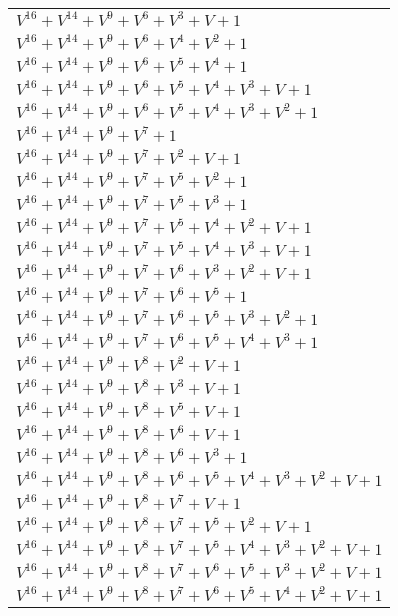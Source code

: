 \documentclass[12pt]{article}
\begin{document}
\begin{adjustwidth}{-4cm}{}
\begin{center}
\begin{longtable}{|l|}
$V^{16}  +V^{14}  +V^{9}  +V^{6}  +V^{3}  + V + 1$ \\
$V^{16}  +V^{14}  +V^{9}  +V^{6}  +V^{4}  +V^{2}  + 1$ \\
$V^{16}  +V^{14}  +V^{9}  +V^{6}  +V^{5}  +V^{4}  + 1$ \\
$V^{16}  +V^{14}  +V^{9}  +V^{6}  +V^{5}  +V^{4}  +V^{3}  + V + 1$ \\
$V^{16}  +V^{14}  +V^{9}  +V^{6}  +V^{5}  +V^{4}  +V^{3}  +V^{2}  + 1$ \\
$V^{16}  +V^{14}  +V^{9}  +V^{7}  + 1$ \\
$V^{16}  +V^{14}  +V^{9}  +V^{7}  +V^{2}  + V + 1$ \\
$V^{16}  +V^{14}  +V^{9}  +V^{7}  +V^{5}  +V^{2}  + 1$ \\
$V^{16}  +V^{14}  +V^{9}  +V^{7}  +V^{5}  +V^{3}  + 1$ \\
$V^{16}  +V^{14}  +V^{9}  +V^{7}  +V^{5}  +V^{4}  +V^{2}  + V + 1$ \\
$V^{16}  +V^{14}  +V^{9}  +V^{7}  +V^{5}  +V^{4}  +V^{3}  + V + 1$ \\
$V^{16}  +V^{14}  +V^{9}  +V^{7}  +V^{6}  +V^{3}  +V^{2}  + V + 1$ \\
$V^{16}  +V^{14}  +V^{9}  +V^{7}  +V^{6}  +V^{5}  + 1$ \\
$V^{16}  +V^{14}  +V^{9}  +V^{7}  +V^{6}  +V^{5}  +V^{3}  +V^{2}  + 1$ \\
$V^{16}  +V^{14}  +V^{9}  +V^{7}  +V^{6}  +V^{5}  +V^{4}  +V^{3}  + 1$ \\
$V^{16}  +V^{14}  +V^{9}  +V^{8}  +V^{2}  + V + 1$ \\
$V^{16}  +V^{14}  +V^{9}  +V^{8}  +V^{3}  + V + 1$ \\
$V^{16}  +V^{14}  +V^{9}  +V^{8}  +V^{5}  + V + 1$ \\
$V^{16}  +V^{14}  +V^{9}  +V^{8}  +V^{6}  + V + 1$ \\
$V^{16}  +V^{14}  +V^{9}  +V^{8}  +V^{6}  +V^{3}  + 1$ \\
$V^{16}  +V^{14}  +V^{9}  +V^{8}  +V^{6}  +V^{5}  +V^{4}  +V^{3}  +V^{2}  + V + 1$ \\
$V^{16}  +V^{14}  +V^{9}  +V^{8}  +V^{7}  + V + 1$ \\
$V^{16}  +V^{14}  +V^{9}  +V^{8}  +V^{7}  +V^{5}  +V^{2}  + V + 1$ \\
$V^{16}  +V^{14}  +V^{9}  +V^{8}  +V^{7}  +V^{5}  +V^{4}  +V^{3}  +V^{2}  + V + 1$ \\
$V^{16}  +V^{14}  +V^{9}  +V^{8}  +V^{7}  +V^{6}  +V^{5}  +V^{3}  +V^{2}  + V + 1$ \\
$V^{16}  +V^{14}  +V^{9}  +V^{8}  +V^{7}  +V^{6}  +V^{5}  +V^{4}  +V^{2}  + V + 1$ \\

\end{longtable}
\end{center}
\end{adjustwidth}
\end{document}

